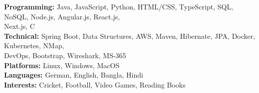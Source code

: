 \documentclass[10pt]{article}
\begin{document}
\begin{tabbing}
    \textbf{Programming:} \= Java, JavaScript, Python, HTML/CSS, TypeScript, SQL, NoSQL, Node.js, Angular.js, React.js, \\ Next.js, C \\
    \textbf{Technical:} \> Spring Boot, Data Structures, AWS, Maven, Hibernate, JPA, Docker, Kubernetes, NMap, \\ DevOps, Bootstrap, Wireshark, MS-365 \\
    \textbf{Platforms:} \> Linux, Windows, MacOS \\
    \textbf{Languages:} \> German, English, Bangla, Hindi \\
    \textbf{Interests:} \> Cricket, Football, Video Games, Reading Books \\
\end{tabbing}
\end{document}
